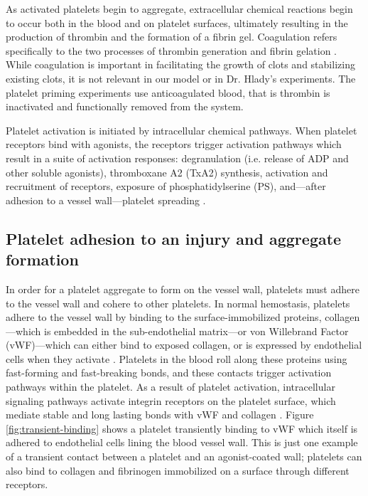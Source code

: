 As activated platelets begin to aggregate, extracellular chemical
reactions begin to occur both in the blood and on platelet surfaces,
ultimately resulting in the production of thrombin and the formation
of a fibrin gel. Coagulation refers specifically to the two processes
of thrombin generation and fibrin gelation \cite{Fogelson2015}. While
coagulation is important in facilitating the growth of clots and
stabilizing existing clots, it is not relevant in our model or in
Dr. Hlady's experiments. The platelet priming experiments use
anticoagulated blood, that is thrombin is inactivated and functionally
removed from the system.

Platelet activation is initiated by intracellular chemical
pathways. When platelet receptors bind with agonists, the receptors
trigger activation pathways which result in a suite of activation
responses: degranulation (i.e. release of ADP and other soluble
agonists), thromboxane A2 (TxA2) synthesis, activation and recruitment
of  receptors, exposure of phosphatidylserine (PS),
and---after adhesion to a vessel wall---platelet spreading
\cite{Bye2016}.

\subsection{Platelet adhesion to an injury and aggregate formation}
\label{sec:platelet-adhesion}

In order for a platelet aggregate to form on the vessel wall,
platelets must adhere to the vessel wall and cohere to other
platelets. In normal hemostasis, platelets adhere to the vessel wall
by binding to the surface-immobilized proteins, collagen---which is
embedded in the sub-endothelial matrix---or von Willebrand Factor
(vWF)---which can either bind to exposed collagen, or is expressed by
endothelial cells when they activate \cite{Fogelson2015}. Platelets in
the blood roll along these proteins using fast-forming and
fast-breaking bonds, and these contacts trigger activation pathways
within the platelet. As a result of platelet activation, intracellular
signaling pathways activate integrin receptors on the platelet
surface, which mediate stable and long lasting bonds with vWF and
collagen \cite{Bye2016,Li2010,Fogelson2015,Qiu2015}. Figure
\ref{fig:transient-binding} shows a platelet transiently binding to
vWF which itself is adhered to endothelial cells lining the blood
vessel wall. This is just one example of a transient contact between
a platelet and an agonist-coated wall; platelets can also bind to
collagen and fibrinogen immobilized on a surface through different
receptors. 

